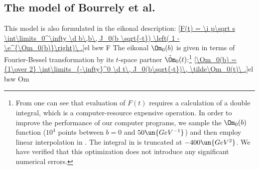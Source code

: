 \subsection{The model of Bourrely et al.}

This model  is also formulated in the eikonal description:
\eqref{F(t) = \i p\sqrt s \int\limits_0^\infty \d b\,b\, J_0(b \sqrt{-t}) \left( 1 - \e^{\Om_0(b)}\right)\ .}{el bsw F}
The eikonal $\Om_0(b)$ is given in terms of Fourier-Bessel transformation by its $t$-space partner $\tilde\Om_0(t)$:\footnote{%
From  one can see that evaluation of $F(t)$ requires a calculation of a double integral, which is a computer-resource expensive operation. In order to improve the performance of our computer programs, we sample the $\Om_0(b)$ function ($10^4$ points between $b=0$ and $50\un{GeV^{-1}}$) and then employ linear interpolation in . The integral in  is truncated at $-400\un{GeV^2}$. We have verified that this optimization does not introduce any significant numerical errors.
}
\eqref{\Om_0(b) = {1\over 2} \int\limits_{-\infty}^0 \d t\, J_0(b\sqrt{-t})\, \tilde\Om_0(t)\ .}{el bsw Om}

